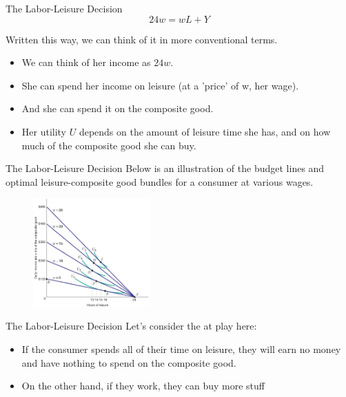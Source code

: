 \documentclass[11pt,t]{beamer}
\begin{document}
\begin{frame}{The Labor-Leisure Decision}
  $$
    24w = wL + Y
  $$

  Written this way, we can think of it in more conventional terms.
  \bigskip
  \begin{itemize}
    \item We can think of her income as $24w$.

    \item She can spend her income on leisure (at a 'price' of w, her wage).

    \item And she can spend it on the composite good.

    \item Her utility $U$ depends on the amount of leisure time she has, and on how much of the composite good she can buy.
  \end{itemize}
\end{frame}

\begin{frame}{The Labor-Leisure Decision}
  Below is an illustration of the budget lines and optimal leisure-composite good bundles for a consumer at various wages.

  \begin{figure}
    \includegraphics[width=170px]{figures/fig5_24.jpg}
  \end{figure}
\end{frame}

\begin{frame}{The Labor-Leisure Decision}
  Let's consider the  at play here:
  
  \begin{itemize}
    \item If the consumer spends all of their time on leisure, they will earn no money and have nothing to spend on the composite good.

    \item On the other hand, if they work, they can buy more stuff
  \end{itemize}
\end{frame}
\end{document}
